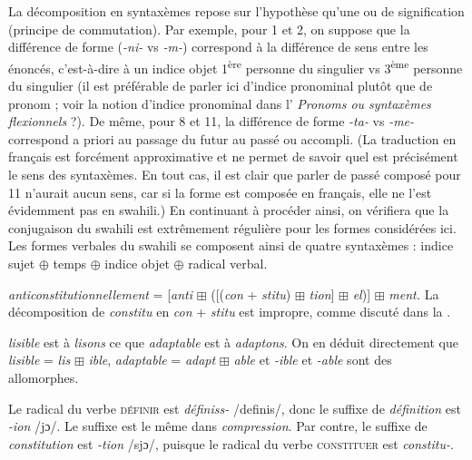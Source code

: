 {     La décomposition en syntaxèmes repose sur l’hypothèse qu’une  ou de signification (principe de commutation). Par exemple, pour 1 et 2, on suppose que la différence de forme (\textit{{}-ni-} vs \textit{{}-m-}) correspond à la différence de sens entre les énoncés, c’est-à-dire à un indice objet 1\textsuperscript{ère} personne du singulier vs 3\textsuperscript{ème} personne du singulier (il est préférable de parler ici d’indice pronominal plutôt que de pronom ; voir la notion d’indice pronominal dans l’ \textit{Pronoms ou syntaxèmes flexionnels} ?). De même, pour 8 et 11, la différence de forme \textit{{}-ta-} vs \textit{{}-me-} correspond a priori au passage du futur au passé ou accompli. (La traduction en français est forcément approximative et ne permet de savoir quel est précisément le sens des syntaxèmes. En tout cas, il est clair que parler de passé composé pour 11 n’aurait aucun sens, car si la forme est composée en français, elle ne l’est évidemment pas en swahili.) En continuant à procéder ainsi, on vérifiera que la conjugaison du swahili est extrêmement régulière pour les formes considérées ici. Les formes verbales du swahili se composent ainsi de quatre syntaxèmes : indice sujet \textrm{${\oplus}$} temps \textrm{${\oplus}$} indice objet \textrm{${\oplus}$} radical verbal.

     \textit{anticonstitutionnellement} = [\textit{anti} \textrm{${\boxplus}$} ([(\textit{con} + \textit{stitu}) \textrm{${\boxplus}$} \textit{tion}] \textrm{${\boxplus}$} \textit{el})] \textrm{${\boxplus}$} \textit{ment.} La décomposition de \textit{constitu} en \textit{con} + \textit{stitu} est impropre, comme discuté dans la .

     \textit{lisible} est à \textit{lisons} ce que \textit{adaptable} est à \textit{adaptons}. On en déduit directement que \textit{lisible} = \textit{lis} \textrm{${\boxplus}$} \textit{ible}, \textit{adaptable} = \textit{adapt} \textrm{${\boxplus}$} \textit{able} et \textit{{}-ible} et \textit{{}-able} sont des allomorphes.

     Le radical du verbe \textsc{définir} est \textit{définiss-} /definis/, donc le suffixe de \textit{définition} est \textit{{}-ion} /jɔ/. Le suffixe est le même dans \textit{compression}. Par contre, le suffixe de \textit{constitution} est \textit{{}-tion} /sjɔ/, puisque le radical du verbe \textsc{constituer} est \textit{constitu-}.

}
